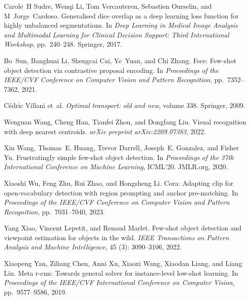 \begin{thebibliography}{52}
Carole~H Sudre, Wenqi Li, Tom Vercauteren, Sebastien Ourselin, and
  M~Jorge~Cardoso.
\newblock Generalised dice overlap as a deep learning loss function for highly
  unbalanced segmentations.
\newblock In \emph{Deep Learning in Medical Image Analysis and Multimodal
  Learning for Clinical Decision Support: Third International Workshop}, pp.\
  240--248. Springer, 2017.

Bo~Sun, Banghuai Li, Shengcai Cai, Ye~Yuan, and Chi Zhang.
\newblock Fsce: Few-shot object detection via contrastive proposal encoding.
\newblock In \emph{Proceedings of the IEEE/CVF Conference on Computer Vision
  and Pattern Recognition}, pp.\  7352--7362, 2021.

C{\'e}dric Villani et~al.
\newblock \emph{Optimal transport: old and new}, volume 338.
\newblock Springer, 2009.

Wenguan Wang, Cheng Han, Tianfei Zhou, and Dongfang Liu.
\newblock Visual recognition with deep nearest centroids.
\newblock \emph{arXiv preprint arXiv:2209.07383}, 2022.

Xin Wang, Thomas~E. Huang, Trevor Darrell, Joseph~E. Gonzalez, and Fisher Yu.
\newblock Frustratingly simple few-shot object detection.
\newblock In \emph{Proceedings of the 37th International Conference on Machine
  Learning}, ICML'20. JMLR.org, 2020.

Xiaoshi Wu, Feng Zhu, Rui Zhao, and Hongsheng Li.
\newblock Cora: Adapting clip for open-vocabulary detection with region
  prompting and anchor pre-matching.
\newblock In \emph{Proceedings of the IEEE/CVF Conference on Computer Vision
  and Pattern Recognition}, pp.\  7031--7040, 2023.

Yang Xiao, Vincent Lepetit, and Renaud Marlet.
\newblock Few-shot object detection and viewpoint estimation for objects in the
  wild.
\newblock \emph{IEEE Transactions on Pattern Analysis and Machine
  Intelligence}, 45 (3):\penalty0 3090--3106, 2022.

Xiaopeng Yan, Ziliang Chen, Anni Xu, Xiaoxi Wang, Xiaodan Liang, and Liang Lin.
\newblock Meta r-cnn: Towards general solver for instance-level low-shot
  learning.
\newblock In \emph{Proceedings of the IEEE/CVF International Conference on
  Computer Vision}, pp.\  9577--9586, 2019.


\end{thebibliography}
